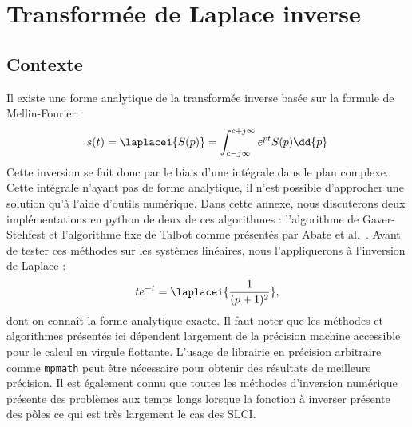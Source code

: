 \chapter{Transformée de Laplace inverse~\label{annexe-invL}}

\section{Contexte}
Il existe une forme analytique de la transformée inverse basée sur
la formule de Mellin-Fourier\cite{Ostertag}:
\[
s(t)=\laplacei{S(p)}=\int_{c-j\infty}^{c+j\infty} e^{pt}S(p)\dd{p}
\]
Cette inversion se fait donc par le biais d'une intégrale dans le plan
complexe. Cette intégrale n'ayant pas de forme analytique, il n'est possible 
d'approcher une solution qu'à l'aide d'outils numérique. 
Dans cette annexe, nous discuterons deux implémentations en python de 
deux de ces algorithmes : 
l'algorithme de Gaver-Stehfest et l'algorithme fixe de Talbot comme présentés
par Abate et al.~\cite{abate2004,abate2006,frwiki:200676411}.
Avant de tester ces méthodes sur les systèmes linéaires, nous l'appliquerons
à l'inversion de Laplace :  
\[
    te^{-t}=\laplacei{\dfrac{1}{(p+1)^2}},
\]
dont on connaît la forme analytique exacte.
Il faut noter que les méthodes et algorithmes présentés ici dépendent 
largement de la précision machine accessible pour le calcul en virgule flottante.
L'usage de librairie en précision arbitraire comme \texttt{mpmath} peut être 
nécessaire pour obtenir des résultats de meilleure précision. Il est également
connu que toutes les méthodes d'inversion numérique présente des problèmes
aux temps longs lorsque la fonction à inverser présente des pôles ce qui 
est très largement le cas des SLCI.
